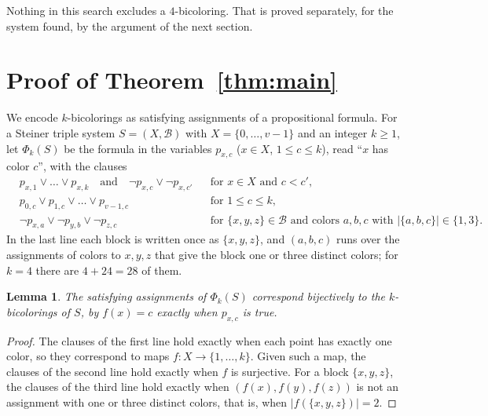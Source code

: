 \documentclass[11pt]{article}
\newtheorem{lemma}[theorem]{Lemma}
\theoremstyle{definition}
\begin{document}
Nothing in this search excludes a $4$-bicoloring. That is proved separately,
for the system found, by the argument of the next section.

\section{Proof of Theorem~\ref{thm:main}}\label{sec:proof}

We encode $k$-bicolorings as satisfying assignments of a propositional
formula. For a Steiner triple system $S=(X,\mathcal{B})$ with
$X=\{0,\dots,v-1\}$ and an integer $k\ge 1$, let $\Phi_k(S)$ be the formula
in the variables $p_{x,c}$ ($x\in X$, $1\le c\le k$), read ``$x$ has color
$c$'', with the clauses
\begin{align*}
&p_{x,1}\vee\dots\vee p_{x,k} \quad\text{and}\quad \neg p_{x,c}\vee\neg p_{x,c'}
  &&\text{for } x\in X \text{ and } c<c',\\
&p_{0,c}\vee p_{1,c}\vee\dots\vee p_{v-1,c} &&\text{for } 1\le c\le k,\\
&\neg p_{x,a}\vee \neg p_{y,b}\vee\neg p_{z,c} &&\text{for }
  \{x,y,z\}\in\mathcal{B} \text{ and colors } a,b,c \text{ with } |\{a,b,c\}|\in\{1,3\}.
\end{align*}
In the last line each block is written once as $\{x,y,z\}$, and
$(a,b,c)$ runs over the assignments of colors to $x,y,z$ that give the
block one or three distinct colors; for $k=4$ there are $4+24=28$ of them.

\begin{lemma}\label{lem:encoding}
The satisfying assignments of $\Phi_k(S)$ correspond bijectively to the
$k$-bicolorings of $S$, by $f(x)=c$ exactly when $p_{x,c}$ is true.
\end{lemma}

\begin{proof}
The clauses of the first line hold exactly when each point has exactly
one color, so they correspond to maps $f\colon X\to\{1,\dots,k\}$. Given
such a map, the clauses of the second line hold exactly when $f$ is
surjective. For a block $\{x,y,z\}$, the clauses of the third line hold
exactly when $(f(x),f(y),f(z))$ is not an assignment with one or three
distinct colors, that is, when $|f(\{x,y,z\})|=2$.
\end{proof}
\end{document}
